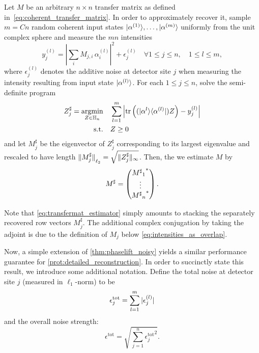 \begin{protocol}%
  \label{prot:detailed_reconstruction}
  Let ${M}$ be an arbitrary $n \times n$ transfer matrix as defined in~\eqref{eq:coherent_transfer_matrix}.
  In order to approximately recover it, sample $m = Cn$ random coherent input states $\ket{{\alpha}^{(1)}},\ldots,\ket{{\alpha}^{(m)}}$ uniformly from the unit complex sphere and measure the $mn$ intensities
  \begin{equation*}
    y_j^{(l)} = \left| \sum_i M_{j,i} \, \alpha_i^{(l)} \right|^2 + \epsilon_j^{(l)} \quad \forall 1 \leq j \leq n, \quad 1 \leq l \leq m,
  \end{equation*}
  where $\epsilon_j^{(l)}$ denotes the additive noise at detector site $j$ when measuring the intensity resulting from input state  $\ket{{\alpha}^{(l)}}$.
  For each $1 \leq j \leq n$, solve the semi-definite program
  \begin{align}
    {Z}^\sharp_{j} = \underset{{Z} \in \mathbb{H}_n}{\operatorname{argmin}}& \quad \sum_{l=1}^m \left| \operatorname{tr} \left( (|{\alpha}^{l} \rangle \langle {\alpha}^{(l)} | )  Z \right) - y_j^{(l)} \right| \label{eq:tmat_recovery_program}\\
    \mathrm{s.t.} & \quad {Z} \geq 0 \nonumber
  \end{align}
  and let ${M}_j^\sharp$ be the eigenvector of ${Z}^\sharp_{j}$ corresponding to its largest eigenvalue and rescaled to have length ${\Vert{M}_j^\sharp\Vert}_{\ell_2} = \sqrt{ \| {Z}^\sharp_{j} \|_\infty}$.
  Then, the we estimate ${M}$ by
  \begin{equation}
    {M}^\sharp =
    \begin{pmatrix}
      {{{M^\sharp}_1}^\ast} \\ \vdots \\  {{{M^\sharp}_n}^\ast}
    \end{pmatrix}.
    \label{eq:transfermat_estimator}
  \end{equation}
\end{protocol}
Note that \cref{eq:transfermat_estimator} simply amounts to stacking the separately recovered row vectors $ M_j^\sharp$.
The additional complex conjugation by taking the adjoint is due to the definition of $ M_j$ below \cref{eq:intensities_as_overlap}.

Now, a simple extension of \cref{thm:phaselift_noisy} yields a similar performance guarantee for \cref{prot:detailed_reconstruction}.
In order to succinctly state this result, we introduce some additional notation.
Define the total noise at detector site $j$ (measured in $\ell_1$-norm) to be
\begin{equation*}
  \epsilon_j^{\mathrm{tot}}= \sum_{l=1}^m {\vert\epsilon_j^{(l)}\vert}
\end{equation*}
and the overall noise strength:
\begin{equation}
  \epsilon^{\mathrm{tot}} = \sqrt{ \sum_{j=1}^n {\epsilon_j^{\mathrm{tot}}}^2}.
\end{equation}


